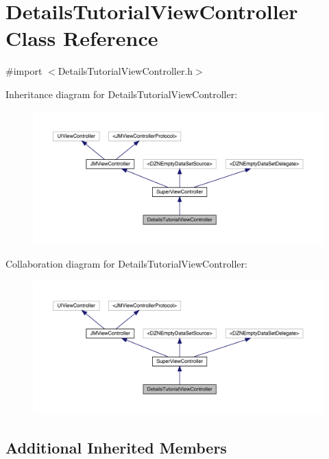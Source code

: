\hypertarget{interface_details_tutorial_view_controller}{}\section{Details\+Tutorial\+View\+Controller Class Reference}
\label{interface_details_tutorial_view_controller}


{\ttfamily \#import $<$Details\+Tutorial\+View\+Controller.\+h$>$}



Inheritance diagram for Details\+Tutorial\+View\+Controller\+:\nopagebreak
\begin{figure}[H]
\begin{center}
\leavevmode
\includegraphics[width=350pt]{interface_details_tutorial_view_controller__inherit__graph}
\end{center}
\end{figure}


Collaboration diagram for Details\+Tutorial\+View\+Controller\+:\nopagebreak
\begin{figure}[H]
\begin{center}
\leavevmode
\includegraphics[width=350pt]{interface_details_tutorial_view_controller__coll__graph}
\end{center}
\end{figure}
\subsection*{Additional Inherited Members}


